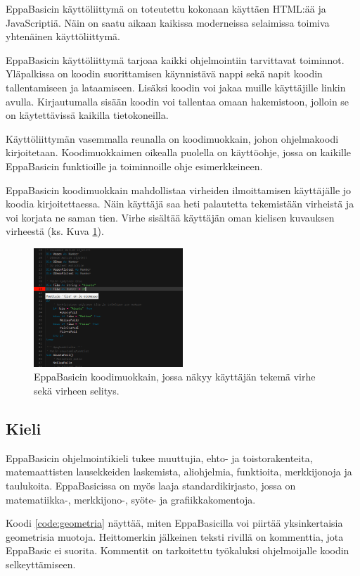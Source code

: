 EppaBasicin käyttöliittymä on toteutettu
kokonaan käyttäen HTML:ää ja JavaScriptiä.
Näin on saatu aikaan kaikissa moderneissa
selaimissa toimiva yhtenäinen käyttöliittymä.

EppaBasicin käyttöliittymä tarjoaa kaikki
ohjelmointiin tarvittavat toiminnot.
Yläpalkissa on koodin suorittamisen käynnistävä
nappi sekä napit koodin tallentamiseen ja lataamiseen.
Lisäksi koodin voi jakaa muille käyttäjille linkin avulla.
Kirjautumalla sisään koodin voi tallentaa
omaan hakemistoon, jolloin se on käytettävissä
kaikilla tietokoneilla.

Käyttöliittymän vasemmalla reunalla on
koodimuokkain, johon
ohjelmakoodi kirjoitetaan.
Koodimuokkaimen oikealla puolella on
käyttöohje, jossa on kaikille
EppaBasicin funktioille
ja toiminnoille ohje esimerkkeineen.

EppaBasicin koodimuokkain mahdollistaa
virheiden ilmoittamisen käyttäjälle jo
koodia kirjoitettaessa.
Näin käyttäjä saa heti palautetta tekemistään
virheistä ja voi korjata ne saman tien.
Virhe sisältää käyttäjän oman
kielisen kuvauksen virheestä
(ks. Kuva \ref{img:virhe}).

\begin{figure}[h]
    \centering
    \includegraphics[width=0.5\textwidth]{virhe}
    \caption{EppaBasicin koodimuokkain, jossa näkyy käyttäjän tekemä virhe sekä virheen selitys.}
    \label{img:virhe}
\end{figure}

\subsection{Kieli}
EppaBasicin ohjelmointikieli tukee
muuttujia,
ehto- ja toistorakenteita,
matemaattisten lausekkeiden laskemista,
aliohjelmia, funktioita,
merkkijonoja ja
taulukoita.
EppaBasicissa on myös
laaja standardikirjasto,
jossa on matematiikka-,
merkkijono-, syöte- ja
grafiikkakomentoja.

Koodi \ref{code:geometria} näyttää,
miten EppaBasicilla voi piirtää
yksinkertaisia geometrisia muotoja.
Heittomerkin  jälkeinen
teksti rivillä on kommenttia,
jota EppaBasic ei suorita.
Kommentit on tarkoitettu
työkaluksi ohjelmoijalle
koodin selkeyttämiseen.

